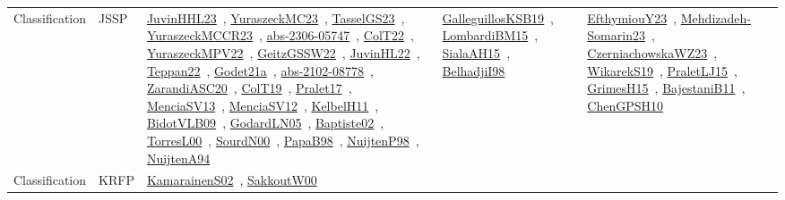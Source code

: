 {\begin{longtable}{lp{3cm}>{\raggedright\arraybackslash}p{6cm}>{\raggedright\arraybackslash}p{6cm}>{\raggedright\arraybackslash}p{8cm}}
Classification & JSSP & \href{works/JuvinHHL23.pdf}{JuvinHHL23}~\cite{JuvinHHL23}, \href{works/YuraszeckMC23.pdf}{YuraszeckMC23}~\cite{YuraszeckMC23}, \href{works/TasselGS23.pdf}{TasselGS23}~\cite{TasselGS23}, \href{works/YuraszeckMCCR23.pdf}{YuraszeckMCCR23}~\cite{YuraszeckMCCR23}, \href{works/abs-2306-05747.pdf}{abs-2306-05747}~\cite{abs-2306-05747}, \href{works/ColT22.pdf}{ColT22}~\cite{ColT22}, \href{works/YuraszeckMPV22.pdf}{YuraszeckMPV22}~\cite{YuraszeckMPV22}, \href{works/GeitzGSSW22.pdf}{GeitzGSSW22}~\cite{GeitzGSSW22}, \href{works/JuvinHL22.pdf}{JuvinHL22}~\cite{JuvinHL22}, \href{works/Teppan22.pdf}{Teppan22}~\cite{Teppan22}, \href{works/Godet21a.pdf}{Godet21a}~\cite{Godet21a}, \href{works/abs-2102-08778.pdf}{abs-2102-08778}~\cite{abs-2102-08778}, \href{works/ZarandiASC20.pdf}{ZarandiASC20}~\cite{ZarandiASC20}, \href{works/ColT19.pdf}{ColT19}~\cite{ColT19}, \href{works/Pralet17.pdf}{Pralet17}~\cite{Pralet17}, \href{works/MenciaSV13.pdf}{MenciaSV13}~\cite{MenciaSV13}, \href{works/MenciaSV12.pdf}{MenciaSV12}~\cite{MenciaSV12}, \href{works/KelbelH11.pdf}{KelbelH11}~\cite{KelbelH11}, \href{works/BidotVLB09.pdf}{BidotVLB09}~\cite{BidotVLB09}, \href{works/GodardLN05.pdf}{GodardLN05}~\cite{GodardLN05}, \href{works/Baptiste02.pdf}{Baptiste02}~\cite{Baptiste02}, \href{works/TorresL00.pdf}{TorresL00}~\cite{TorresL00}, \href{works/SourdN00.pdf}{SourdN00}~\cite{SourdN00}, \href{works/PapaB98.pdf}{PapaB98}~\cite{PapaB98}, \href{works/NuijtenP98.pdf}{NuijtenP98}~\cite{NuijtenP98}, \href{works/NuijtenA94.pdf}{NuijtenA94}~\cite{NuijtenA94} & \href{works/GalleguillosKSB19.pdf}{GalleguillosKSB19}~\cite{GalleguillosKSB19}, \href{works/LombardiBM15.pdf}{LombardiBM15}~\cite{LombardiBM15}, \href{works/SialaAH15.pdf}{SialaAH15}~\cite{SialaAH15}, \href{works/BelhadjiI98.pdf}{BelhadjiI98}~\cite{BelhadjiI98} & \href{works/EfthymiouY23.pdf}{EfthymiouY23}~\cite{EfthymiouY23}, \href{works/Mehdizadeh-Somarin23.pdf}{Mehdizadeh-Somarin23}~\cite{Mehdizadeh-Somarin23}, \href{works/CzerniachowskaWZ23.pdf}{CzerniachowskaWZ23}~\cite{CzerniachowskaWZ23}, \href{works/WikarekS19.pdf}{WikarekS19}~\cite{WikarekS19}, \href{works/PraletLJ15.pdf}{PraletLJ15}~\cite{PraletLJ15}, \href{works/GrimesH15.pdf}{GrimesH15}~\cite{GrimesH15}, \href{works/BajestaniB11.pdf}{BajestaniB11}~\cite{BajestaniB11}, \href{works/ChenGPSH10.pdf}{ChenGPSH10}~\cite{ChenGPSH10}\\
Classification & KRFP & \href{works/KamarainenS02.pdf}{KamarainenS02}~\cite{KamarainenS02}, \href{works/SakkoutW00.pdf}{SakkoutW00}~\cite{SakkoutW00} &  & \\

\end{longtable}}
